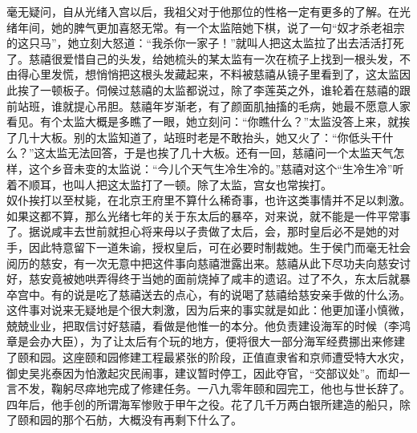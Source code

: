   毫无疑问，自从光绪入宫以后，我祖父对于他那位的性格一定有更多的了解。在光绪年间，她的脾气更加喜怒无常。有一个太监陪她下棋，说了一句“奴才杀老祖宗的这只马”，她立刻大怒道：“我杀你一家子！”就叫人把这太监拉了出去活活打死了。慈禧很爱惜自己的头发，给她梳头的某太监有一次在梳子上找到一根头发，不由得心里发慌，想悄悄把这根头发藏起来，不料被慈禧从镜子里看到了，这太监因此挨了一顿板子。伺候过慈禧的太监都说过，除了李莲英之外，谁轮着在慈禧的跟前站班，谁就提心吊胆。慈禧年岁渐老，有了颜面肌抽搐的毛病，她最不愿意人家看见。有个太监大概是多瞧了一眼，她立刻问：“你瞧什么？”太监没答上来，就挨了几十大板。别的太监知道了，站班时老是不敢抬头，她又火了：“你低头干什么？”这太监无法回答，于是也挨了几十大板。还有一回，慈禧问一个太监天气怎样，这个乡音未变的太监说：“今儿个天气生冷生冷的。”慈禧对这个“生冷生冷”听着不顺耳，也叫人把这太监打了一顿。除了太监，宫女也常挨打。\\

  奴仆挨打以至杖毙，在北京王府里不算什么稀奇事，也许这类事情并不足以刺激。如果这都不算，那么光绪七年的关于东太后的暴卒，对来说，就不能是一件平常事了。据说咸丰去世前就担心将来母以子贵做了太后，会，那时皇后必不是她的对手，因此特意留下一道朱谕，授权皇后，可在必要时制裁她。生于侯门而毫无社会阅历的慈安，有一次无意中把这件事向慈禧泄露出来。慈禧从此下尽功夫向慈安讨好，慈安竟被她哄弄得终于当她的面前烧掉了咸丰的遗诏。过了不久，东太后就暴卒宫中。有的说是吃了慈禧送去的点心，有的说喝了慈禧给慈安亲手做的什么汤。这件事对说来无疑地是个很大刺激，因为后来的事实就是如此：他更加谨小慎微，兢兢业业，把取信讨好慈禧，看做是他惟一的本分。他负责建设海军的时候（李鸿章是会办大臣），为了让太后有个玩的地方，便将很大一部分海军经费挪出来修建了颐和园。这座颐和园修建工程最紧张的阶段，正值直隶省和京师遭受特大水灾，御史吴兆泰因为怕激起灾民闹事，建议暂时停工，因此夺官，“交部议处”。而却一言不发，鞠躬尽瘁地完成了修建任务。一八九零年颐和园完工，他也与世长辞了。四年后，他手创的所谓海军惨败于甲午之役。花了几千万两白银所建造的船只，除了颐和园的那个石舫，大概没有再剩下什么了。
